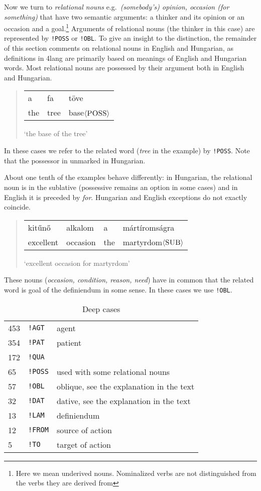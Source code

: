 \documentclass[a4paper,10pt]{article}
\begin{document}
Now we turn to \emph{relational nouns} e.g.\ \emph{(somebody's) opinion, occasion (for something)} that have two semantic arguments: a thinker and its opinion or an occasion and a goal.\footnote{Here we mean underived nouns. Nominalized verbs are not distinguished from the verbs they are derived from} Arguments of relational nouns (the thinker in this case) are represented by \texttt{!POSS} or \texttt{!OBL}. To give an insight to the distinction, the remainder of this section comments on relational nouns in English and Hungarian, as definitions in 4lang are primarily based on meanings of English and Hungarian words. Most {relational nouns} are possessed by their argument both in English and Hungarian. 
\begin{quote}
 \begin{tabular}{lll}
  a &fa &töve
 \\the &tree &base$\langle\textsc{POSS}\rangle$
 \end{tabular}
 
 `the base of the tree'
\end{quote}
In these cases we refer to the related word (\emph{tree} in the example) by \texttt{!POSS}. Note that the possessor in unmarked in Hungarian.
 
About one tenth of the examples behave differently: in Hungarian, the relational noun is in the sublative (possessive remains an option in some cases) and in English it is preceded by \emph{for}. Hungarian and English exceptions do not exactly coincide.
\begin{quote}
 \begin{tabular}{llll}
  kitűnő		& alkalom	& a & mártíromságra
 \\ excellent	& occasion 	& the & martyrdom$\langle\textsc{SUB}\rangle$
 \end{tabular}
 
 `excellent occasion for martyrdom'
\end{quote}
These nouns (\emph{occasion, condition, reason, need}) have in common that the related word is goal of the definiendum in some sense. In these cases we use \texttt{!OBL}.

\begin{table}
\begin{center}
\begin{tabular}{lll}
\\ 453	& \texttt{!AGT} & agent
\\ 354	& \texttt{!PAT} & patient
\\ 172	& \texttt{!QUA} & %
\\ 65	& \texttt{!POSS} & used with some relational nouns
\\ 57	& \texttt{!OBL} & oblique, see the explanation in the text
\\ 32	& \texttt{!DAT} & dative, see the explanation in the text
\\ 13	& \texttt{!LAM} & definiendum %
\\ 12	& \texttt{!FROM} & source of action
\\ 5	& \texttt{!TO}	& target of action
\end{tabular}

\end{center}
\caption{Deep cases}
\label{table_deep}
\end{table}
\end{document}
